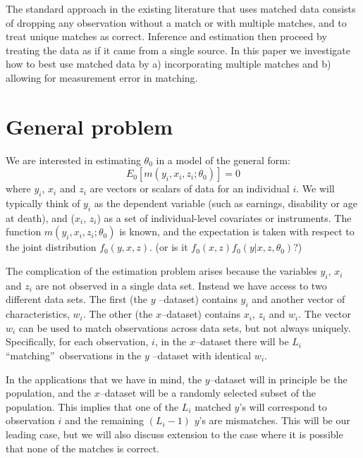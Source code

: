 \documentclass[12pt]{article}
\begin{document}
The standard approach in the existing literature that uses matched data
consists of dropping any observation without a match or with multiple
matches, and to treat unique matches as correct. Inference and estimation
then proceed by treating the data as if it came from a single source. In
this paper we investigate how to best use matched data by a) incorporating
multiple matches and b) allowing for measurement error in matching.

\section{General problem}

We are interested in estimating $\theta_0$ in a model of the general form:
\begin{equation}
E_0\left[ m\left( y_{i},x_{i},z_{i};\theta _{0}\right) \right] =0
\label{Moment}
\end{equation}%
where $y_{i}$, $x_{i}$ and $z_{i}$ are vectors or scalars of data for an
individual $i$. We will typically think of $y_{i}$ as the dependent variable
(such as earnings, disability or age at death), and ($x_{i}$, $z_{i}$) as a
set of individual-level covariates or instruments. The function $m\left(
y_{i},x_{i},z_{i};\theta _{0}\right) $ is known, and the expectation is taken with respect to the joint distribution $f_0(y,x,z)$. (or is it $f_0(x,z)f_0(y|x,z,\theta_0)$?)

The complication of the estimation problem arises because the
variables $y_{i}$, $x_{i}$ and $z_{i}$ are not observed in a single data
set. Instead we have access to two different data sets. The first (the $y$%
--dataset) contains $y_{i}$ and another vector of characteristics, $w_{i}$.
The other (the $x$--dataset) contains $x_{i}$, $z_{i}$ and $w_{i}$. The
vector $w_{i}$ can be used to match observations across data sets, but not
always uniquely.  Specifically, for each observation, $i$, in the $x$--dataset there will be $%
L_{i}$ \textquotedblleft matching\textquotedblright\ observations in the $y$%
--dataset with identical $w_{i}$. 

In the applications that we have in mind,
the $y$--dataset will in principle be the population, and the $x$--dataset will be a randomly selected subset of the population. This implies that one
of the $L_{i}$ matched $y$'s will correspond to observation $i$ and the
remaining $\left( L_{i}-1\right) $ $y$'s are mismatches. This will be our
leading case, but we will also discuss extension to the case where it is
possible that none of the matches is correct.
\end{document}
